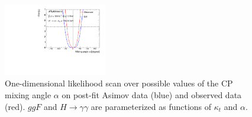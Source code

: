\begin{figure}[htbp]
  \centering
  \includegraphics[width=0.4\textwidth]{figures/tthcp_results/nllscan_alpha_expobs_resolve.pdf}
  \caption{One-dimensional likelihood scan over possible values of the CP mixing angle $\alpha$ on post-fit Asimov data (blue) and observed data (red).  $ggF$ and $H \rightarrow \gamma\gamma$ are parameterized as functions of $\kappa_t$ and $\alpha$.
  \label{fig:alphascan_expobs_resolve}}
\end{figure}
